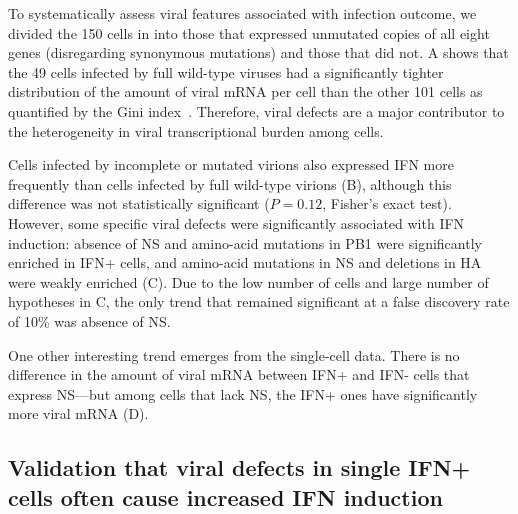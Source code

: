 \documentclass[9pt,lineno]{template}
\begin{document}
\begin{figure}
\begin{fullwidth}
\label{figdata:mutations}

\end{fullwidth}
\end{figure}

To systematically assess viral features associated with infection outcome, we divided the 150 cells in  into those that expressed unmutated copies of all eight genes (disregarding synonymous mutations) and those that did not.
A shows that the 49 cells infected by full wild-type viruses had a significantly tighter distribution of the amount of viral mRNA per cell than the other 101 cells as quantified by the Gini index~\citep{gini1921measurement}.
Therefore, viral defects are a major contributor to the heterogeneity in viral transcriptional burden among cells.

Cells infected by incomplete or mutated virions also expressed IFN more frequently than cells infected by full wild-type virions (B), although this difference was not statistically significant ($P = 0.12$, Fisher's exact test).
However, some specific viral defects were significantly associated with IFN induction: absence of NS and amino-acid mutations in PB1 were significantly enriched in IFN+ cells, and amino-acid mutations in NS and deletions in HA were weakly enriched (C).
Due to the low number of cells and large number of hypotheses in C, the only trend that remained significant at a false discovery rate of 10\% was absence of NS.

One other interesting trend emerges from the single-cell data.
There is no difference in the amount of viral mRNA between IFN+ and IFN- cells that express NS---but among cells that lack NS, the IFN+ ones have significantly more viral mRNA (D).

\subsection{Validation that viral defects in single IFN+ cells often cause increased IFN induction}
\end{document}

